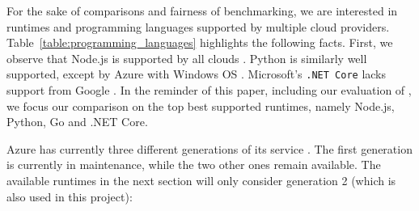 For the sake of comparisons and fairness of benchmarking, we are interested in runtimes and programming languages supported by multiple cloud providers.  
Table~\ref{table:programming_languages} highlights the following facts.
First, we observe that Node.js is supported by all clouds  . 
Python is similarly well supported, except by Azure with Windows \gls{OS} .
Microsoft's \texttt{.NET Core} lacks support from Google . 
In the reminder of this paper, including our evaluation of \sys, we focus our comparison on the top best supported runtimes, namely Node.js, Python, Go and .NET Core. 

\begin{remark}	
Azure has currently three different generations of its service  \cite{AzureFunctionsGenerations} . 
The first generation is currently in maintenance, while the two other ones remain available. 
The available runtimes in the next section will only consider generation 2 (which is also used in this project):
\end{remark}

